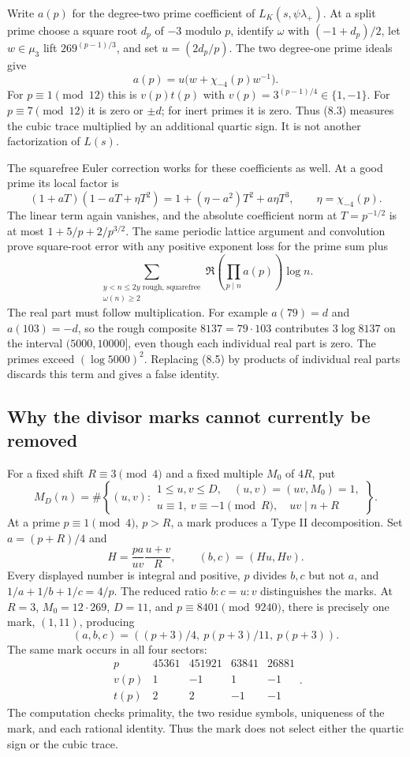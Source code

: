 \documentclass[11pt]{article}
\begin{document}
Write $a(p)$ for the degree-two prime coefficient of $L_K(s,\psi\lambda_+)$. At a split prime choose a square root $d_p$ of $-3$ modulo $p$, identify $\omega$ with $(-1+d_p)/2$, let $w\in\mu_3$ lift $269^{(p-1)/3}$, and set $u=(2d_p/p)$. The two degree-one prime ideals give
\[
 a(p)=u\bigl(w+\chi_{-4}(p)w^{-1}\bigr).
 \tag{8.4}
\]
For $p\equiv1\pmod{12}$ this is $v(p)t(p)$ with $v(p)=3^{(p-1)/4}\in\{1,-1\}$. For $p\equiv7\pmod{12}$ it is zero or $\pm d$; for inert primes it is zero. Thus (8.3) measures the cubic trace multiplied by an additional quartic sign. It is not another factorization of $L(s)$.

The squarefree Euler correction works for these coefficients as well. At a good prime its local factor is
\[
 (1+aT)(1-aT+\eta T^2)
   =1+(\eta-a^2)T^2+a\eta T^3,\qquad\eta=\chi_{-4}(p).
\]
The linear term again vanishes, and the absolute coefficient norm at $T=p^{-1/2}$ is at most $1+5/p+2/p^{3/2}$. The same periodic lattice argument and convolution prove square-root error with any positive exponent loss for the prime sum plus
\[
 \sum_{\substack{y<n\le2y\text{ rough, squarefree}\\\omega(n)\ge2}}
      \Re\left(\prod_{p\mid n}a(p)\right)\log n.
 \tag{8.5}
\]
The real part must follow multiplication. For example $a(79)=d$ and $a(103)=-d$, so the rough composite $8137=79\cdot103$ contributes $3\log8137$ on the interval $(5000,10000]$, even though each individual real part is zero. The primes exceed $(\log5000)^2$. Replacing (8.5) by products of individual real parts discards this term and gives a false identity.

\subsection{Why the divisor marks cannot currently be removed}
For a fixed shift $R\equiv3\pmod4$ and a fixed multiple $M_0$ of $4R$, put
\[
 M_D(n)=\#\left\{(u,v):\begin{array}{l}
 1\le u,v\le D,\quad (u,v)=(uv,M_0)=1,\\
 u\equiv1,\ v\equiv-1\pmod R,\quad uv\mid n+R
 \end{array}\right\}.
\]
At a prime $p\equiv1\pmod4$, $p>R$, a mark produces a Type II decomposition. Set $a=(p+R)/4$ and
\[
 H=\frac{pa}{uv}\frac{u+v}{R},\qquad (b,c)=(Hu,Hv).
\]
Every displayed number is integral and positive, $p$ divides $b,c$ but not $a$, and $1/a+1/b+1/c=4/p$. The reduced ratio $b:c=u:v$ distinguishes the marks. At $R=3$, $M_0=12\cdot269$, $D=11$, and $p\equiv8401\pmod{9240}$, there is precisely one mark, $(1,11)$, producing
\[
 (a,b,c)=((p+3)/4,\ p(p+3)/11,\ p(p+3)).
\]
The same mark occurs in all four sectors:
\[
\begin{array}{c|rrrr}
p&45361&451921&63841&26881\\
\hline
v(p)&1&-1&1&-1\\
t(p)&2&2&-1&-1
\end{array}.
\]
The computation checks primality, the two residue symbols, uniqueness of the mark, and each rational identity. Thus the mark does not select either the quartic sign or the cubic trace.
\end{document}
